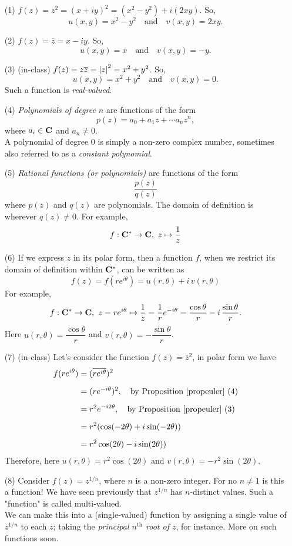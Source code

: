 \vspace*{1em}

\begin{example}\hfill
\begin{itemize}
\item[(1)] $f(z) = z^2 = (x+iy)^2 = (x^2 - y^2) + i(2xy)$. So, \[u(x,y) = x^2 - y^2 \quad \text{and} \quad v(x,y) = 2xy.\]
\item[(2)] $f(z) = \overline{z} = x-iy$. So, \[u(x,y) = x \quad \text{and} \quad v(x,y) = -y.\]
\item[(3)] (in-class) $f(z) = z\overline{z} = \left\lvert z\right\rvert^2 = x^2+y^2$. So, \[u(x,y) = x^2 + y^2 \quad \text{and} \quad v(x,y) = 0.\]
Such a function is \emph{real-valued}.
\item[(4)] \emph{Polynomials of degree $n$} are functions of the form \[p(z) = a_0 + a_1z + \cdots a_nz^n,\] where $a_i \in \mathbf C$ and $a_n \neq 0$.\\[1em]
A polynomial of degree $0$ is simply a non-zero complex number, sometimes also referred to as a \emph{constant polynomial}.
\item[(5)] \emph{Rational functions (or polynomials)} are functions of the form
\[\dfrac{p(z)}{q(z)}\]
where $p(z)$ and $q(z)$ are polynomials. The domain of definition is wherever $q(z) \neq 0$. For example,
\[f:\mathbf C^* \to \mathbf C,\ z \mapsto \frac{1}{z}\]
\item[(6)] If we express $z$ in its polar form, then a function $f$, when we restrict its domain of definition within $\mathbf C^*$, can be written as
\[f(z) = f(re^{i\theta}) = u(r,\theta) + i\,v(r,\theta)\]
For example,
\[f:\mathbf C^* \to \mathbf C,\ z = re^{i\theta} \mapsto \frac{1}{z} = \frac{1}{r}e^{-i\theta} = \frac{\cos\theta}{r} - i\,\frac{\sin\theta}{r}.\]
Here $u(r,\theta) = \dfrac{\cos\theta}{r}$ and $v(r,\theta) = -\dfrac{\sin\theta}{r}$.
\item[(7)] (in-class) Let's consider the function $f(z) = \overline{z}^2$, in polar form we have
\begin{align*}
f(re^{i\theta}) &= (\overline{re^{i\theta}})^2\\[0.5em]
&= (re^{-i\theta})^2,\quad \text{by Proposition \ref{propeuler} (4)}\\[0.5em]
&= r^2e^{-i2\theta},\quad \text{by Proposition \ref{propeuler} (3)}\\[0.5em]
&= r^2(\cos(-2\theta) + i\sin(-2\theta))\\[0.5em]
&= r^2\cos(2\theta) - i\sin(2\theta))
\end{align*}
Therefore, here $u(r,\theta) = r^2\cos(2\theta)$ and $v(r,\theta) = -r^2\sin(2\theta)$.
\item[(8)] Consider $f(z) = z^{1/n}$, where $n$ is a non-zero integer. For no $n \neq 1$ is this a function! We have seen previously that $z^{1/n}$ has $n$-distinct values. Such a "function" is called multi-valued.\\[1em]
We can make this into a (single-valued) function by assigning a single value of $z^{1/n}$ to each $z$; taking the \emph{principal $n^{\text{th}}$ root of $z$}, for instance. More on such functions soon. 
\end{itemize}
\end{example}

